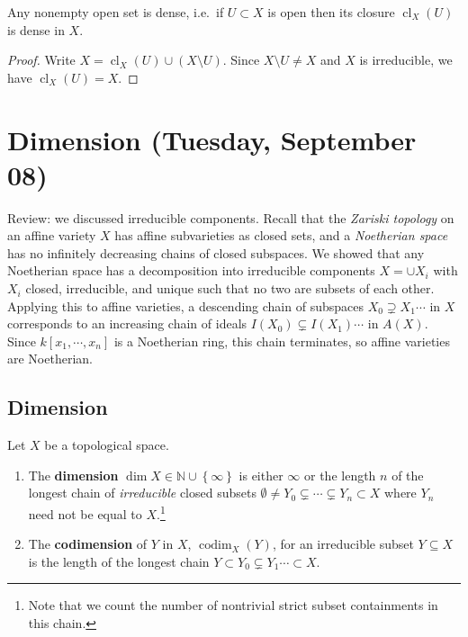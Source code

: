 \begin{proposition}[?]

Any nonempty open set is dense, i.e.~if \(U\subset X\) is open then its
closure \(\operatorname{cl}_X(U)\) is dense in \(X\).

\end{proposition}

\begin{proof}

Write \(X = \operatorname{cl}_X(U) \cup(X\setminus U)\). Since
\(X\setminus U \neq X\) and \(X\) is irreducible, we have
\(\operatorname{cl}_X(U) = X\).

\end{proof}

\hypertarget{dimension-tuesday-september-08}{%
\section{Dimension (Tuesday, September
08)}\label{dimension-tuesday-september-08}}

Review: we discussed irreducible components. Recall that the
\emph{Zariski topology} on an affine variety \(X\) has affine
subvarieties as closed sets, and a \emph{Noetherian space} has no
infinitely decreasing chains of closed subspaces. We showed that any
Noetherian space has a decomposition into irreducible components
\(X = \cup X_i\) with \(X_i\) closed, irreducible, and unique such that
no two are subsets of each other. Applying this to affine varieties, a
descending chain of subspaces \(X_0 \supsetneq X_1 \cdots\) in \(X\)
corresponds to an increasing chain of ideals
\(I(X_0) \subsetneq I(X_1) \cdots\) in \(A(X)\). Since
\(k[x_1, \cdots, x_{n}]\) is a Noetherian ring, this chain terminates,
so affine varieties are Noetherian.

\hypertarget{dimension}{%
\subsection{Dimension}\label{dimension}}

\begin{definition}[Dimensions]

Let \(X\) be a topological space.

\begin{enumerate}
\def\labelenumi{\arabic{enumi}.}
\item
  The \textbf{dimension}
  \(\dim X \in {\mathbb{N}}\cup\left\{{\infty}\right\}\) is either
  \(\infty\) or the length \(n\) of the longest chain of
  \emph{irreducible} closed subsets
  \(\emptyset \neq Y_0 \subsetneq \cdots \subsetneq Y_n \subset X\)
  where \(Y_n\) need not be equal to \(X\).\footnote{Note that we count
    the number of nontrivial strict subset containments in this chain.}
\item
  The \textbf{codimension} of \(Y\) in \(X\),
  \(\operatorname{codim}_X(Y)\), for an irreducible subset
  \(Y\subseteq X\) is the length of the longest chain
  \(Y\subset Y_0 \subsetneq Y_1 \cdots \subset X\).
\end{enumerate}

\end{definition}

